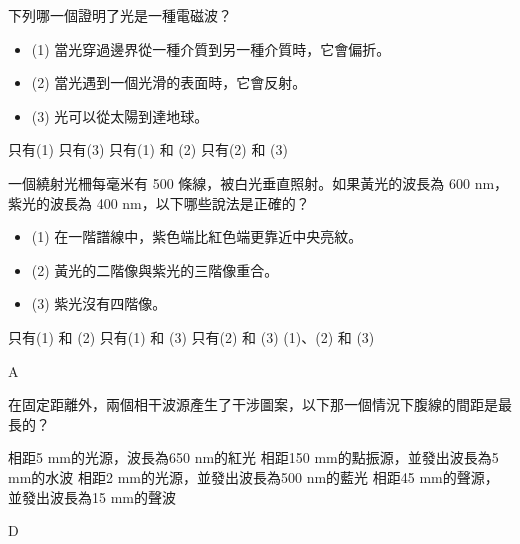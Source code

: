 {
    下列哪一個證明了光是一種電磁波？\\
    \begin{itemize}
        \item[] (1) 當光穿過邊界從一種介質到另一種介質時，它會偏折。
        \item[] (2) 當光遇到一個光滑的表面時，它會反射。
        \item[] (3) 光可以從太陽到達地球。\\
    \end{itemize}
    \begin{choices}
        \choice 只有(1)
        \CorrectChoice 只有(3)
        \choice 只有(1) 和 (2)
        \choice 只有(2) 和 (3)
    \end{choices}
}{}

{
    一個繞射光柵每毫米有 500 條線，被白光垂直照射。如果黃光的波長為 600 nm，紫光的波長為 400 nm，以下哪些說法是正確的？\\

    \begin{itemize}
        \item[] (1) 在一階譜線中，紫色端比紅色端更靠近中央亮紋。
        \item[] (2) 黃光的二階像與紫光的三階像重合。
        \item[] (3) 紫光沒有四階像。\\
    \end{itemize}
    \begin{choices}
        \CorrectChoice 只有(1) 和 (2)
        \choice 只有(1) 和 (3)
        \choice 只有(2) 和 (3)
        \choice (1)、(2) 和 (3)
    \end{choices}
}{\mckey A}

{
    在固定距離外，兩個相干波源產生了干涉圖案，以下那一個情況下腹線的間距是最長的？\\
    \begin{choices}
        \choice 相距5 mm的光源，波長為650 nm的紅光
        \choice 相距150 mm的點振源，並發出波長為5 mm的水波
        \choice 相距2 mm的光源，並發出波長為500 nm的藍光
        \CorrectChoice 相距45 mm的聲源，並發出波長為15 mm的聲波\\
    \end{choices}
}{\mckey D}

